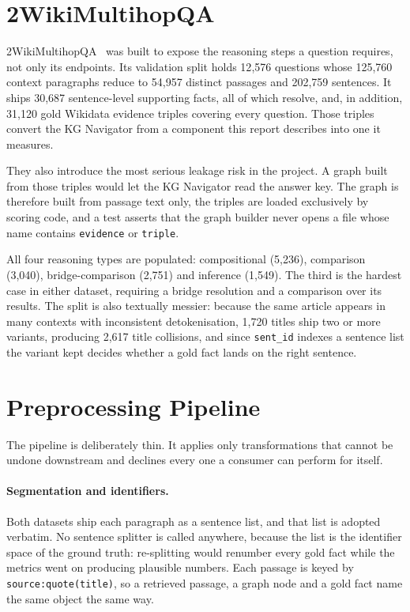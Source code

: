 \section{2WikiMultihopQA}
\label{sec:twowiki}

2WikiMultihopQA~\cite{ho2020constructing} was built to expose the reasoning
steps a question requires, not only its endpoints. Its validation split holds
12{,}576 questions whose 125{,}760 context paragraphs reduce to 54{,}957
distinct passages and 202{,}759 sentences. It ships 30{,}687 sentence-level
supporting facts, all of which resolve, and, in addition, 31{,}120 gold
Wikidata evidence triples covering every question. Those triples convert the
KG Navigator from a component this report describes into one it measures.

They also introduce the most serious leakage risk in the project. A graph built
from those triples would let the KG Navigator read the answer key. The graph is
therefore built from passage text only, the triples are loaded exclusively by
scoring code, and a test asserts that the graph builder never opens a file
whose name contains \texttt{evidence} or \texttt{triple}.

All four reasoning types are populated: compositional (5{,}236), comparison
(3{,}040), bridge-comparison (2{,}751) and inference (1{,}549). The third is
the hardest case in either dataset, requiring a bridge resolution and a
comparison over its results. The split is also textually messier: because the
same article appears in many contexts with inconsistent detokenisation, 1{,}720
titles ship two or more variants, producing 2{,}617 title collisions, and since
\texttt{sent\_id} indexes a sentence list the variant kept decides whether a
gold fact lands on the right sentence.

\section{Preprocessing Pipeline}
\label{sec:preprocessing}

The pipeline is deliberately thin. It applies only transformations that cannot
be undone downstream and declines every one a consumer can perform for itself.

\paragraph{Segmentation and identifiers.} Both datasets ship each paragraph as
a sentence list, and that list is adopted verbatim. No sentence splitter is
called anywhere, because the list is the identifier space of the ground truth:
re-splitting would renumber every gold fact while the metrics went on producing
plausible numbers. Each passage is keyed by \texttt{source:quote(title)}, so a
retrieved passage, a graph node and a gold fact name the same object the same
way.

